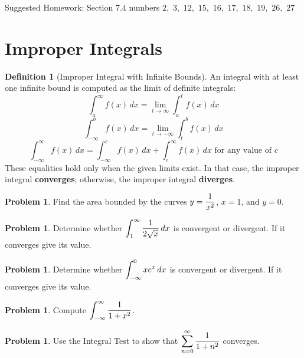 \documentclass[letterpaper, twoside, 12pt]{book}
\theoremstyle{definition}
\theoremstyle{definition}
\newtheorem{definition}[theorem]{Definition}
\newtheorem{problem}[theorem]{Problem}
\newcommand{\ds}{\ensuremath{\displaystyle}}
\begin{document}
\vfill

\noindent Suggested Homework: Section $7.4$ numbers $2,$ $3,$ $12,$ $15,$ $16,$ $17,$ $18,$ $19,$ $26,$ $27$

\newpage

\setcounter{section}{7}
\section{Improper Integrals}

\begin{definition}[Improper Integral with Infinite Bounds]
  An integral with at least one infinite bound is computed as the
  limit of definite integrals:
  \[
    \int_a^\infty f(x)\,dx = \lim_{t\to\infty} \int_a^t f(x)\,dx
  \]
  \[
    \int_{-\infty}^b f(x)\,dx = \lim_{t\to-\infty} \int_t^b f(x)\,dx
  \]
  \[
    \int_{-\infty}^\infty f(x)\,dx
      =
    \int_{-\infty}^c f(x)\,dx + \int_c^\infty f(x)\,dx
    \text{ for any value of } c
  \]
  These equalities hold only when the given limits exist. In that case, the
  improper integral \textbf{converges}; otherwise, the improper integral
  \textbf{diverges}.
\end{definition}

\begin{problem}
 Find the area bounded by the curves $\ds y = \frac{1}{x^2}$, $x=1$, and $y=0$.
\end{problem}

\vfill

\begin{problem}
 Determine whether $\ds \int_1^\infty \frac{1}{2\sqrt{x}} \, dx$ is
 convergent or divergent. If it converges give its value.
\end{problem}

\vfill

\newpage

\begin{problem}
  Determine whether $\ds \int_{-\infty}^0 xe^x \, dx$ is convergent or
  divergent. If it converges give its value.
\end{problem}

\vfill

\begin{problem}
  Compute $\ds\int_{-\infty}^\infty \frac{1}{1+x^2}$.
\end{problem}

\vfill

\begin{problem}
  Use the Integral Test to show that $\ds\sum_{n=0}^\infty \frac{1}{1+n^2}$
  converges.
\end{problem}
\end{document}

